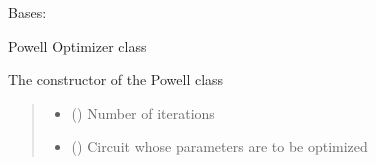 \documentclass[letterpaper,10pt,english]{sphinxmanual}
\begin{document}
\begin{fulllineitems}
\begin{fulllineitems}
\begin{quote}
\begin{description}
\begin{itemize}
\end{itemize}

\end{description}\end{quote}

\end{fulllineitems}


\end{fulllineitems}


\begin{fulllineitems}
\label{\detokenize{qcompute_qapp.optimizer:qcompute_qapp.optimizer.Powell}}
\pysigstartsignatures
{}
\pysigstopsignatures
\sphinxAtStartPar
Bases: {\hyperref[\detokenize{qcompute_qapp.optimizer:qcompute_qapp.optimizer.BasicOptimizer}]{}}

\sphinxAtStartPar
Powell Optimizer class

\sphinxAtStartPar
The constructor of the Powell class
\begin{quote}\begin{description}
\begin{itemize}
\item {} 
\sphinxAtStartPar
{} () \textendash{} Number of iterations

\item {} 
\sphinxAtStartPar
{} ({\hyperref[\detokenize{qcompute_qapp.circuit:qcompute_qapp.circuit.BasicCircuit}]{}}) \textendash{} Circuit whose parameters are to be optimized

\end{itemize}

\end{description}\end{quote}


\end{fulllineitems}
\end{document}
